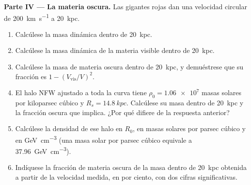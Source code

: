 \begin{problem}
\medskip\noindent\textbf{Parte IV --- La materia oscura.} Las gigantes rojas
dan una velocidad circular de \qty{200}{km.s^{-1}} a \qty{20}{kpc}.
\begin{enumerate}[resume]
\item Calcúlese la masa dinámica dentro de \qty{20}{kpc}.
\item Calcúlese la masa dinámica de la materia visible dentro de
  \qty{20}{kpc}.
\item Calcúlese la masa de materia oscura dentro de \qty{20}{kpc}, y demuéstrese que
  su fracción es $1 - (V_\mathrm{vis}/V)^2$.
\item El halo NFW ajustado a toda la curva tiene
  $\rho_0 = \num{1.06e7}$ masas solares por kiloparsec cúbico y
  $R_s = \qty{14.8}{kpc}$. Calcúlese su masa dentro de \qty{20}{kpc} y la
  fracción oscura que implica. ¿Por qué difiere de la respuesta anterior?
\item Calcúlese la densidad de ese halo en $R_0$, en masas solares por
  parsec cúbico y en \unit{GeV.cm^{-3}} (una masa solar por parsec cúbico
  equivale a \qty{37.96}{GeV.cm^{-3}}).
\item Indíquese la fracción de materia oscura de la masa dentro de \qty{20}{kpc}
  obtenida a partir de la velocidad medida, en por ciento, con dos cifras
  significativas.
\end{enumerate}
\end{problem}

